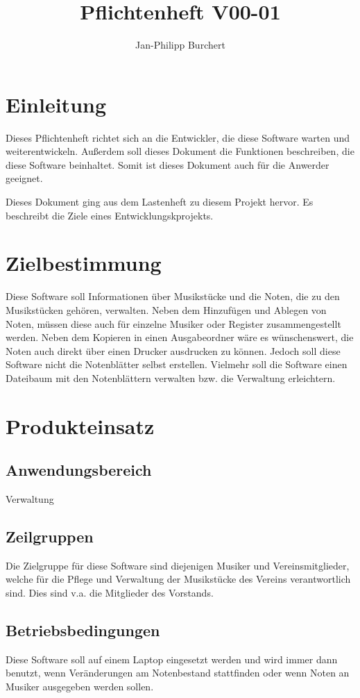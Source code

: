 \documentclass[10pt]{scrartcl}
\title{Pflichtenheft V00-01}
\author{Jan-Philipp Burchert}
\date{ }
\begin{document}
\maketitle

 
\tableofcontents
\newpage
\section{Einleitung}
Dieses Pflichtenheft richtet sich an die Entwickler, die diese Software warten und weiterentwickeln. Außerdem soll dieses Dokument die Funktionen beschreiben, die diese Software beinhaltet. Somit ist dieses Dokument auch für die Anwerder geeignet.

Dieses Dokument ging aus dem Lastenheft zu diesem Projekt hervor. Es beschreibt die Ziele eines Entwicklungskprojekts.

\section{Zielbestimmung}
Diese Software soll Informationen über Musikstücke und die Noten, die zu den Musikstücken gehören, verwalten. Neben dem Hinzufügen  und Ablegen von Noten, müssen diese auch für einzelne Musiker oder Register zusammengestellt werden. Neben dem Kopieren in einen Ausgabeordner wäre es wünschenswert, die Noten auch direkt über einen Drucker ausdrucken zu können. Jedoch soll diese Software nicht die Notenblätter selbst erstellen. Vielmehr soll die Software einen Dateibaum mit den Notenblättern verwalten  bzw. die Verwaltung erleichtern.

\section{Produkteinsatz}
\subsection{Anwendungsbereich}
Verwaltung
\subsection{Zeilgruppen}
Die Zielgruppe für diese Software sind diejenigen Musiker und Vereinsmitglieder, welche für die Pflege und Verwaltung der Musikstücke des Vereins verantwortlich sind. Dies sind v.a. die Mitglieder des Vorstands.
\subsection{Betriebsbedingungen}
Diese Software soll auf einem Laptop eingesetzt werden und wird immer dann benutzt, wenn Veränderungen am Notenbestand stattfinden oder wenn Noten an Musiker ausgegeben werden sollen.
\end{document}

